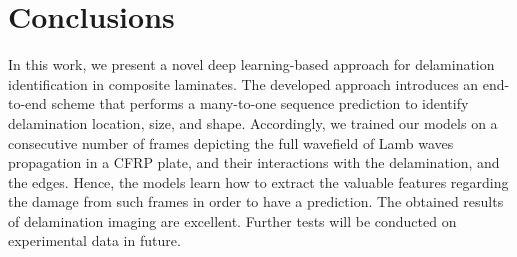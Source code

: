\documentclass{IOS-Book-Article}
\begin{document}
\section{Conclusions}
\begin{sloppypar}
	In this work, we present a novel deep learning-based approach for delamination identification in composite laminates.
	The developed approach introduces an end-to-end scheme that performs a many-to-one sequence prediction to identify delamination location, size, and shape.
	Accordingly, we trained our models on a consecutive number of frames depicting the full wavefield of Lamb waves propagation in a CFRP plate, and their interactions with the delamination, and the edges.
	Hence, the models learn how to extract the valuable features regarding the damage from such frames in order to have a prediction.
	The obtained results of delamination imaging are excellent. Further tests will be conducted on experimental data in future.
\end{sloppypar}
%	
%	
%	
%	
%	
%	
%	
\end{document}
